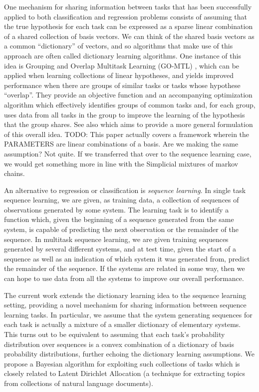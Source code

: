 \documentclass[letterpaper]{article}
\begin{document}
One mechanism for sharing information between tasks that has been successfully applied to both classification and regression problems consists of assuming that the true hypothesis for each task can be expressed as a sparse linear combination of a shared collection of basis vectors. We can think of the shared basis vectors as a common ``dictionary'' of vectors, and so algorithms that make use of this approach are often called dictionary learning algorithms. One instance of this idea is Grouping and Overlap Multitask Learning (GO-MTL) \citep{kumar2012learning}, which can be applied when learning collections of linear hypotheses, and yields improved performance when there are groups of similar tasks or tasks whose hypothese ``overlap''. They provide an objective function and an accompanying optimization algorithm which effectively identifies groups of common tasks and, for each group, uses data from all tasks in the group to improve the learning of the hypothesis that the group shares. See also \citet{zhang2008flexible} which aims to provide a more general formulation of this overall idea.
TODO: This paper actually covers a framework wherein the PARAMETERS are linear combinations of a basis. Are we making the same assumption? Not quite. If we transferred that over to the sequence learning case, we would get something more in line with the Simplicial mixtures of markov chains.

An alternative to regression or classification is \textit{sequence learning}. In single task sequence learning, we are given, as training data, a collection of sequences of observations generated by some system. The learning task is to identify a function which, given the beginning of a sequence generated from the same system, is capable of predicting the next observation or the remainder of the sequence. In multitask sequence learning, we are given training sequences generated by several different systems, and at test time, given the start of a sequence as well as an indication of which system it was generated from, predict the remainder of the sequence. If the systems are related in some way, then we can hope to use data from all the systems to improve our overall performance.

The current work extends the dictionary learning idea to the sequence learning setting, providing a novel mechanism for sharing information between sequence learning tasks. In particular, we assume that the system generating sequences for each task is actually a mixture of a smaller dictionary of elementary systems. This turns out to be equivalent to assuming that each task's probability distribution over sequences is a convex combination of a dictionary of basis probability distributions, further echoing the dictionary learning assumptions. We propose a Bayesian algorithm for exploiting such collections of tasks which is closely related to Latent Dirichlet Allocation (a technique for extracting topics from collections of natural language documents).
\end{document}
